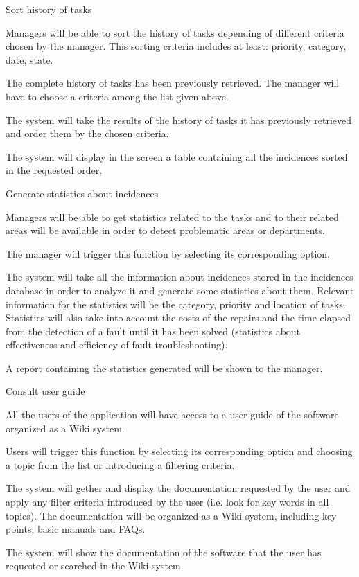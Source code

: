 \begin{requirement}{Sort history of tasks}

\reqdesc Managers will be able to sort the history of tasks depending of different criteria chosen by the manager. This sorting criteria includes at least: priority, category, date, state.

\reqin The complete history of tasks has been previously retrieved. The manager will have to choose a criteria among the list given above.

\reqsteps The system will take the results of the history of tasks it has previously retrieved and order them by the chosen criteria.

\reqout The system will display in the screen a table containing all the incidences sorted in the requested order.

\end{requirement}


\begin{requirement}{Generate statistics about incidences}

\reqdesc Managers will be able to get statistics related to the tasks and to their related areas will be available in order to
detect problematic areas or departments.

\reqin The manager will trigger this function by selecting its corresponding option.

\reqsteps The system will take all the information about incidences stored in the incidences database in order to analyze it and generate some statistics about them. Relevant information for the statistics will be the category, priority and location of tasks. Statistics will also take into account the costs of the repairs and the time elapsed from the detection of a fault until it has been solved (statistics about effectiveness and efficiency of fault troubleshooting).

\reqout A report containing the statistics generated will be shown to the manager.

\end{requirement}



\begin{requirement}{Consult user guide}

\reqdesc All the users of the application will have access to a user guide of the software organized as a Wiki system.

\reqin Users will trigger this function by selecting its corresponding option and choosing a topic from the list or introducing a filtering criteria.

\reqsteps The system will gether and display the documentation requested by the user and apply any filter criteria introduced by the user (i.e. look for key words in all topics). The documentation will be organized as a Wiki system, including key points, basic manuals and FAQs.

\reqout The system will show the documentation of the software that the user has requested or searched in the Wiki system.

\end{requirement}


